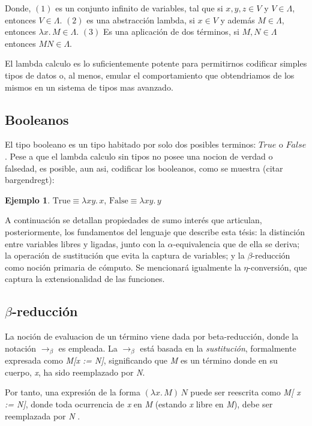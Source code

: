 \documentclass[a4paper,12pt]{report}
\theoremstyle{definition}
\newtheorem{example}{Ejemplo}[chapter]
\theoremstyle{plain}
\theoremstyle{remark}
\begin{document}
Donde, $(1)$ es un conjunto infinito de variables, tal que si $x, y, z \in \textit{V}$ y $V \in \Lambda$, entonces $V \in \Lambda$. $(2)$ es una abstracción lambda, si $x \in V$ y además $M \in \Lambda$, entonces $\lambda x.\, M \in \Lambda $. $(3)$ Es una aplicación de dos términos, si $M, N \in \Lambda$ entonces $M N \in \Lambda$.

El lambda calculo es lo suficientemente potente para permitirnos codificar simples tipos de datos o, al menos, emular el comportamiento que obtendriamos de los mismos en un sistema de tipos mas avanzado.

\subsection{Booleanos}
El tipo booleano es un tipo habitado por solo dos posibles terminos: $True$ o $False$. Pese a que el lambda calculo sin tipos no posee una nocion de verdad o falsedad, es posible, aun asi, codificar los booleanos, como se muestra (citar bargendregt):

\begin{example}
  $\mathrm{True} \equiv \lambda xy.\, x$, \quad $\mathrm{False} \equiv \lambda xy.\, y$
\end{example}

A continuación se detallan propiedades de sumo interés que articulan, posteriormente, los fundamentos del lenguaje que describe esta tésis: la distinción entre variables libres y ligadas, junto con la $\alpha$-equivalencia que de ella se deriva; la operación de sustitución que evita la captura de variables; y la $\beta$-reducción como noción primaria de cómputo. Se mencionará igualmente la $\eta$-conversión, que captura la extensionalidad de las funciones.

\subsection{$\beta$-reducción}
La noción de evaluacion de un término viene dada por beta-reducción, donde la notación $\to_\beta$ es empleada. La $\to_\beta$ está basada en la \textit{sustitución}, formalmente expresada como \textit{M[x := N]}, significando que \textit{M} es un término donde en su cuerpo, \textit{x}, ha sido reemplazado por \textit{N}.

Por tanto, una expresión de la forma $(\lambda x.\, M)\, N$ puede ser reescrita como \textit{M[ x := N]}, donde toda ocurrencia de \textit{x} en \textit{M} (estando \textit{x} libre en \textit{M}), debe ser reemplazada por \textit{N} \citep{geuvers2014}.
\end{document}
